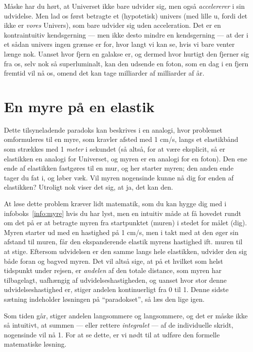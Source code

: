 \documentclass[useAMS,danish]{aa}
\begin{document}
Måske har du hørt, at Universet ikke bare udvider sig, men også \emph{accelererer} i sin udvidelse.
Men lad os først betragte et (hypotetisk) univers (med lille u, fordi det ikke er \emph{vores} Univers), som bare udvider sig uden acceleration.
Det er en kontraintuitiv kendsgerning --- men ikke desto mindre en kendsgerning --- at der i et sådan univers ingen grænse er for, hvor langt vi kan se, hvis vi bare venter længe nok.
Uanset hvor fjern en galakse er, og dermed hvor hurtigt den fjerner sig fra os, selv nok så superluminalt, kan den udsende en foton, som en dag i en fjern fremtid vil nå os, omend det kan tage milliarder af milliarder af år.

\section{En myre på en elastik}
\label{sec:myre}

Dette tilsyneladende paradoks kan beskrives i en analogi, hvor problemet omformuleres til en myre, som kravler afsted med 1 cm/s, langs et elastikbånd som strækkes med 1 \emph{meter} i sekundet (så altså, for at være eksplicit, så er elastikken en analogi for Universet, og myren er en analogi for en foton).
Den ene ende af elastikken fastgøres til en mur, og her starter myren; den anden ende tager du fat i, og løber væk.
Vil myren nogensinde kunne nå dig for enden af elastikken?
Utroligt nok viser det sig, at ja, det kan den.

At løse dette problem kræver lidt matematik, som du kan hygge dig med i infoboks~\ref{info:myre} hvis du har lyst, men en intuitiv måde at få hovedet rundt om det på er at betragte myren fra startpunktet (muren) i stedet for målet (dig).
Myren starter ud med en hastighed på 1 cm/s, men i takt med at den øger sin afstand til muren, får den ekspanderende elastik myrens hastighed ift. muren til at stige.
Eftersom udvidelsen er den samme langs hele elastikken, udvider den sig både foran og bagved myren.
Det vil altså sige, at på et hvilket som helst tidspunkt under rejsen, er \emph{andelen} af den totale distance, som myren har tilbagelagt, uafhængig af udvidelseshastigheden, og uanset hvor stor denne udvidelseshastighed er, stiger andelen kontinuerligt fra 0 til 1.
Denne sidste sætning indeholder løsningen på ``paradokset'', så læs den lige igen.

Som tiden går, stiger andelen langsommere og langsommere, og det er måske ikke så intuitivt, at summen --- eller rettere \emph{integralet} --- af de individuelle skridt, nogensinde vil nå 1.
For at se dette, er vi nødt til at udføre den formelle matematiske løsning.
\end{document}

